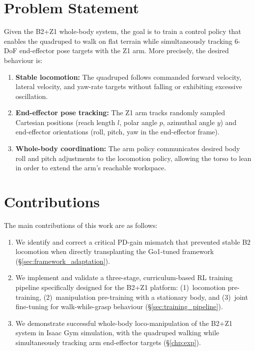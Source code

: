 \section{Problem Statement}

Given the B2+Z1 whole-body system, the goal is to train a control policy that
enables the quadruped to walk on flat terrain while simultaneously tracking
6-DoF end-effector pose targets with the Z1 arm.
More precisely, the desired behaviour is:
\begin{enumerate}
  \item \textbf{Stable locomotion:} The quadruped follows commanded forward
        velocity, lateral velocity, and yaw-rate targets without falling or
        exhibiting excessive oscillation.
  \item \textbf{End-effector pose tracking:} The Z1 arm tracks randomly sampled
        Cartesian positions (reach length $l$, polar angle $p$, azimuthal angle $y$)
        and end-effector orientations (roll, pitch, yaw in the end-effector frame).
  \item \textbf{Whole-body coordination:} The arm policy communicates desired body
        roll and pitch adjustments to the locomotion policy, allowing the torso to
        lean in order to extend the arm's reachable workspace.
\end{enumerate}

\section{Contributions}

The main contributions of this work are as follows:
\begin{enumerate}
  \item We identify and correct a critical PD-gain mismatch that prevented stable
        B2 locomotion when directly transplanting the Go1-tuned framework
        (\S\ref{sec:framework_adaptation}).
  \item We implement and validate a three-stage, curriculum-based RL training
        pipeline specifically designed for the B2+Z1 platform: (1)~locomotion
        pre-training, (2)~manipulation pre-training with a stationary body, and
        (3)~joint fine-tuning for walk-while-grasp behaviour
        (\S\ref{sec:training_pipeline}).
  \item We demonstrate successful whole-body loco-manipulation of the B2+Z1
        system in Isaac Gym simulation, with the quadruped walking while
        simultaneously tracking arm end-effector targets (\S\ref{chp:exp}).
\end{enumerate}

